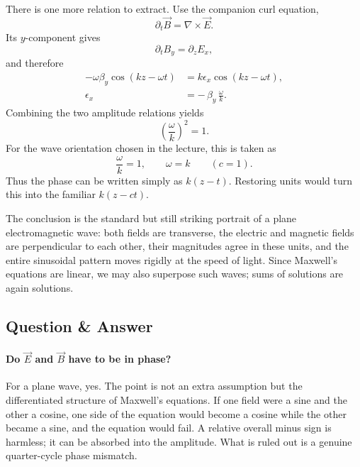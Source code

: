 There is one more relation to extract. Use the companion curl equation,
\begin{equation}
\partial_t \vec B=\nabla\times \vec E.
\end{equation}
Its \(y\)-component gives
\begin{equation}
\partial_t B_y=\partial_z E_x,
\end{equation}
and therefore
\begin{align}
-\omega \beta_y \cos(kz-\omega t)
&=
k\epsilon_x \cos(kz-\omega t),
\\
\epsilon_x
&=
-\,\beta_y\,\frac{\omega}{k}.
\end{align}
Combining the two amplitude relations yields
\begin{equation}
\left(\frac{\omega}{k}\right)^2=1.
\end{equation}
For the wave orientation chosen in the lecture, this is taken as
\begin{equation}
\frac{\omega}{k}=1,
\qquad
\omega=k
\qquad
(c=1).
\end{equation}
Thus the phase can be written simply as \(k(z-t)\). Restoring units would turn this into the familiar \(k(z-ct)\).

The conclusion is the standard but still striking portrait of a plane electromagnetic wave: both fields are transverse, the electric and magnetic fields are perpendicular to each other, their magnitudes agree in these units, and the entire sinusoidal pattern moves rigidly at the speed of light. Since Maxwell's equations are linear, we may also superpose such waves; sums of solutions are again solutions.

\subsection{Question \& Answer}

\paragraph{Do \(\vec E\) and \(\vec B\) have to be in phase?}
For a plane wave, yes. The point is not an extra assumption but the differentiated structure of Maxwell's equations. If one field were a sine and the other a cosine, one side of the equation would become a cosine while the other became a sine, and the equation would fail. A relative overall minus sign is harmless; it can be absorbed into the amplitude. What is ruled out is a genuine quarter-cycle phase mismatch.

